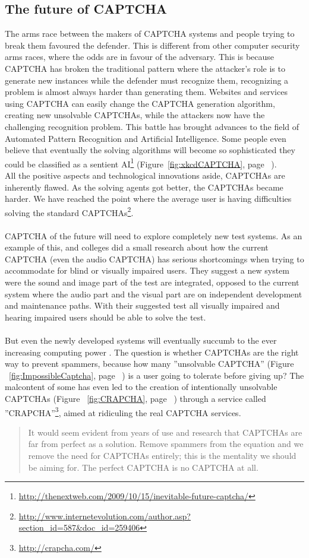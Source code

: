\documentclass[pdftex,a4paper,12pt,twoside]{report}
\theoremstyle{plain} \newtheorem{theorem}{Theorem} \newtheorem{proposition}{Proposition} \newtheorem{lemma}{Lemma} \newtheorem*{corollary}{Corollary}
\theoremstyle{definition} \newtheorem{definition}{Definition} \newtheorem{conjecture}{Conjecture} \newtheorem*{example}{Example} \newtheorem{algorithm}{Algorithm}
\theoremstyle{remark} \newtheorem*{remark}{Remark} \newtheorem*{note}{Note} \newtheorem{case}{Case}
\begin{document}
\subsection{The future of CAPTCHA}
The arms race between the makers of CAPTCHA systems and people trying to break them favoured the defender. This is different from other computer security arms races, where the odds are in favour of the adversary. This is because CAPTCHA has broken the traditional pattern where the attacker's role is to generate new instances while the defender must recognize them, recognizing a problem is almost always harder than generating them. Websites and services using CAPTCHA can easily change the CAPTCHA generation algorithm, creating new unsolvable CAPTCHAs, while the attackers now have the challenging recognition problem. This battle has brought advances to the field of Automated Pattern Recognition and Artificial Intelligence. Some people even believe that eventually the solving algorithms will become so sophisticated they could be classified as a sentient AI\footnote{\url{http://thenextweb.com/2009/10/15/inevitable-future-captcha/}} (Figure~\ref{fig:xkcdCAPTCHA}, page ~\pageref{fig:xkcdCAPTCHA}).\\
All the positive aspects and technological innovations aside, CAPTCHAs are inherently flawed. As the solving agents got better, the CAPTCHAs became harder. We have reached the point where the average user is having difficulties solving the standard CAPTCHAs\footnote{\url{http://www.internetevolution.com/author.asp?section_id=587&doc_id=259406}}. \\\\CAPTCHA of the future will need to explore completely new test systems. As an example of this, \citep{Sauer2008} and colleges did a small research about how the current CAPTCHA (even the audio CAPTCHA) has serious shortcomings when trying to accommodate for blind or visually impaired users. They suggest a new system were the sound and image part of the test are integrated, opposed to the current system where the audio part and the visual part are on independent development and maintenance paths. With their suggested test all visually impaired and hearing impaired users should be able to solve the test.\\\\
But even the newly developed systems will eventually succumb to the ever increasing computing power \citep{Beede2010}. The question is whether CAPTCHAs are the right way to prevent spammers, because how many ''unsolvable CAPTCHA'' (Figure ~\ref{fig:ImpossibleCaptcha}, page ~\pageref{fig:ImpossibleCaptcha}) is a user going to tolerate before giving up? The malcontent of some has even led to the creation of intentionally unsolvable CAPTCHAs (Figure ~\ref{fig:CRAPCHA}, page ~\pageref{fig:CRAPCHA}) through a service called ''CRAPCHA''\footnote{\url{http://crapcha.com/}}, aimed at ridiculing the real CAPTCHA services.
\begin{quote}
It would seem evident from years of use and research that CAPTCHAs are far from perfect as a solution. Remove spammers from the equation and we remove the need for CAPTCHAs entirely; this is the mentality we should be aiming for. The perfect CAPTCHA is no CAPTCHA at all. \citep{Bushell2011}
\end{quote}\newpage
\end{document}
